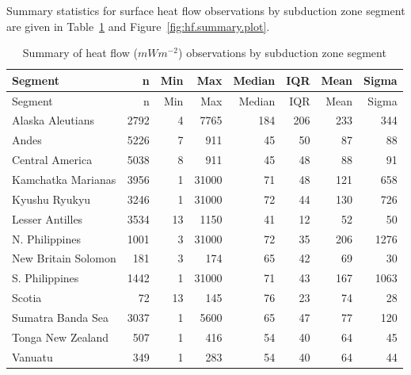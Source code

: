 \documentclass[draft,linenumbers]{agujournal2018}
\begin{document}
Summary statistics for surface heat flow observations by subduction zone
segment are given in Table~\ref{tbl:hf.summary.table} and
Figure~\ref{fig:hf.summary.plot}.

\hypertarget{tbl:hf.summary.table}{}
\begin{longtable}[]{@{}lrrrrrrr@{}}
\caption{\label{tbl:hf.summary.table}Summary of heat flow (\(mWm^{-2}\))
observations by subduction zone segment}\tabularnewline
\toprule
Segment & n & Min & Max & Median & IQR & Mean & Sigma \\
\midrule
\endfirsthead
\toprule
Segment & n & Min & Max & Median & IQR & Mean & Sigma \\
\midrule
\endhead
Alaska Aleutians & 2792 & 4 & 7765 & 184 & 206 & 233 & 344 \\
Andes & 5226 & 7 & 911 & 45 & 50 & 87 & 88 \\
Central America & 5038 & 8 & 911 & 45 & 48 & 88 & 91 \\
Kamchatka Marianas & 3956 & 1 & 31000 & 71 & 48 & 121 & 658 \\
Kyushu Ryukyu & 3246 & 1 & 31000 & 72 & 44 & 130 & 726 \\
Lesser Antilles & 3534 & 13 & 1150 & 41 & 12 & 52 & 50 \\
N. Philippines & 1001 & 3 & 31000 & 72 & 35 & 206 & 1276 \\
New Britain Solomon & 181 & 3 & 174 & 65 & 42 & 69 & 30 \\
S. Philippines & 1442 & 1 & 31000 & 71 & 43 & 167 & 1063 \\
Scotia & 72 & 13 & 145 & 76 & 23 & 74 & 28 \\
Sumatra Banda Sea & 3037 & 1 & 5600 & 65 & 47 & 77 & 120 \\
Tonga New Zealand & 507 & 1 & 416 & 54 & 40 & 64 & 45 \\
Vanuatu & 349 & 1 & 283 & 54 & 40 & 64 & 44 \\
\bottomrule
\end{longtable}
\end{document}
